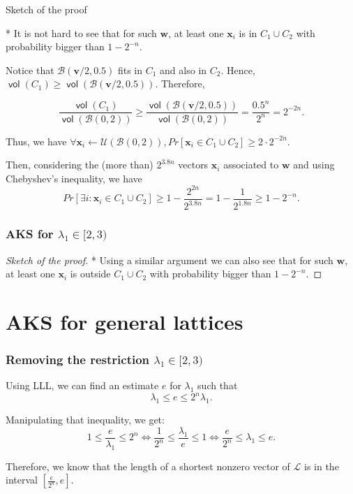 \documentclass[aspectratio=43]{beamer}
\newcommand{\ball}[1]{\mathcal{B}(0, #1)}
\DeclareMathOperator{\vol}{\textsf{vol}}
\let\vec\mathbf %
\theoremstyle{remark}
\begin{document}
\begin{frame}
Sketch of the proof
\vspace*{0.25cm}

* It is not hard to see that for such $\vec{w}$, at least one $\vec{x}_i$ is in 
$C_1 \cup C_2$ with probability bigger than $1 - 2^{-n}$.

Notice that $\mathcal{B}(\vec{v}/2, 0.5)$ fits in $C_1$ and also in $C_2$. 
Hence, $\vol(C_1) \ge \vol(\mathcal{B}(\vec{v}/2, 0.5))$. Therefore, 

$$\frac{\vol(C_1)}{\vol(\ball{2})} \ge \frac{\vol(\mathcal{B}(\vec{v}/2, 
0.5))}{\vol(\ball{2})} = \frac{0.5^n}{2^n} = 2^{-2n}.$$

Thus, we have $\forall \vec{x}_i \leftarrow \mathcal{U}\left(\ball{2}\right), 
Pr[\vec{x}_i \in C_1 \cup C_2] \ge 2\cdot 2^{-2n}$.

Then, considering the (more than) $2^{3.8n}$ vectors $\vec{x}_i$ associated to 
$\vec{w}$ and using Chebyshev's inequality, we have 
$$Pr[\exists i : \vec{x}_i \in C_1 \cup C_2] \ge 1 - 
\frac{2^{2n}}{2^{3.8n}} = 1 - \frac{1}{2^{1.8n}} \ge 1 - 2^{-n}.$$

\end{frame}


\begin{frame}
\frametitle{AKS for $\lambda_1 \in [2, 3)$}

\begin{proof}[Sketch of the proof]
* Using a similar argument we can also see that for such $\vec{w}$, at least 
one $\vec{x}_i$ is outside $C_1 \cup C_2$ with probability bigger than $1 - 
2^{-n}$.
\end{proof}
\end{frame}


\section{AKS for general lattices}
\begin{frame}
\frametitle{Removing the restriction $\lambda_1 \in [2, 3)$}

Using LLL, we can find an estimate $e$ for $\lambda_1$ such that
$$\lambda_1 \le e \le 2^n\lambda_1.$$

Manipulating that inequality, we get:
$$1 \le \frac{e}{\lambda_1} \le 2^n \Leftrightarrow \frac{1}{2^n} \le 
\frac{\lambda_1}{e} \le 1
\Leftrightarrow \frac{e}{2^n} \le \lambda_1 \le e.$$

Therefore, we know that the length of a shortest nonzero vector of 
$\mathcal{L}$ is in the interval $\left[ \frac{e}{2^{n}}, e \right]$.

\end{frame}
\end{document}

